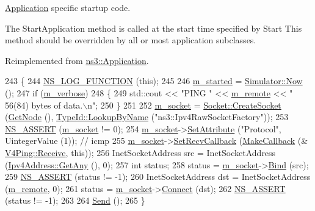 \hyperlink{classns3_1_1Application}{Application} specific startup code. 

The Start\+Application method is called at the start time specified by Start This method should be overridden by all or most application subclasses. 

Reimplemented from \hyperlink{classns3_1_1Application_a3405dd01508beacce8ed6e3a20bdf05a}{ns3\+::\+Application}.


\begin{DoxyCode}
243 \{
244   \hyperlink{log-macros-disabled_8h_a90b90d5bad1f39cb1b64923ea94c0761}{NS\_LOG\_FUNCTION} (\textcolor{keyword}{this});
245 
246   \hyperlink{classns3_1_1V4Ping_af7dd3e807bcafb10bb3ce472e9181e8c}{m\_started} = \hyperlink{classns3_1_1Simulator_ac3178fa975b419f7875e7105be122800}{Simulator::Now} ();
247   \textcolor{keywordflow}{if} (\hyperlink{classns3_1_1V4Ping_a0b843e4454492e5a20860b6c624b667b}{m\_verbose})
248     \{
249       std::cout << \textcolor{stringliteral}{"PING  "} << \hyperlink{classns3_1_1V4Ping_a30b2005deccba89dc440a120853864f2}{m\_remote} << \textcolor{stringliteral}{" 56(84) bytes of data.\(\backslash\)n"};
250     \}
251 
252   \hyperlink{classns3_1_1V4Ping_a1f778736aaa1d07de9bb66375f20942f}{m\_socket} = \hyperlink{classns3_1_1Socket_ad448a62bb50ad3dbac59c879a885a8d2}{Socket::CreateSocket} (\hyperlink{classns3_1_1Application_a664b15088389bec8e35b35742138f097}{GetNode} (), 
      \hyperlink{classns3_1_1TypeId_a119cf99c20931fdc294602cd360b180e}{TypeId::LookupByName} (\textcolor{stringliteral}{"ns3::Ipv4RawSocketFactory"}));
253   \hyperlink{assert_8h_a6dccdb0de9b252f60088ce281c49d052}{NS\_ASSERT} (\hyperlink{classns3_1_1V4Ping_a1f778736aaa1d07de9bb66375f20942f}{m\_socket} != 0);
254   \hyperlink{classns3_1_1V4Ping_a1f778736aaa1d07de9bb66375f20942f}{m\_socket}->\hyperlink{classns3_1_1ObjectBase_ac60245d3ea4123bbc9b1d391f1f6592f}{SetAttribute} (\textcolor{stringliteral}{"Protocol"}, UintegerValue (1)); \textcolor{comment}{// icmp}
255   \hyperlink{classns3_1_1V4Ping_a1f778736aaa1d07de9bb66375f20942f}{m\_socket}->\hyperlink{classns3_1_1Socket_a243f7835ef1a85f9270fd3577e3a40da}{SetRecvCallback} (\hyperlink{group__makecallbackmemptr_ga9376283685aa99d204048d6a4b7610a4}{MakeCallback} (&
      \hyperlink{classns3_1_1V4Ping_a87c38673f7b4c568d114c2815ff2aa78}{V4Ping::Receive}, \textcolor{keyword}{this}));
256   InetSocketAddress src = InetSocketAddress (\hyperlink{classns3_1_1Ipv4Address_a7a39b330c8e701183a411d5779fca1a4}{Ipv4Address::GetAny} (), 0);
257   \textcolor{keywordtype}{int} status;
258   status = \hyperlink{classns3_1_1V4Ping_a1f778736aaa1d07de9bb66375f20942f}{m\_socket}->\hyperlink{classns3_1_1Socket_ada93439a43de2028b5a8fc6621dad482}{Bind} (src);
259   \hyperlink{assert_8h_a6dccdb0de9b252f60088ce281c49d052}{NS\_ASSERT} (status != -1);
260   InetSocketAddress dst = InetSocketAddress (\hyperlink{classns3_1_1V4Ping_a30b2005deccba89dc440a120853864f2}{m\_remote}, 0);
261   status = \hyperlink{classns3_1_1V4Ping_a1f778736aaa1d07de9bb66375f20942f}{m\_socket}->\hyperlink{classns3_1_1Socket_a97f08aaf37b8fd7d4b5cad4dfdd4022a}{Connect} (dst);
262   \hyperlink{assert_8h_a6dccdb0de9b252f60088ce281c49d052}{NS\_ASSERT} (status != -1);
263 
264   \hyperlink{classns3_1_1V4Ping_a26d3a4285998df72a37dfa62b9097e4b}{Send} ();
265 \}
\end{DoxyCode}
